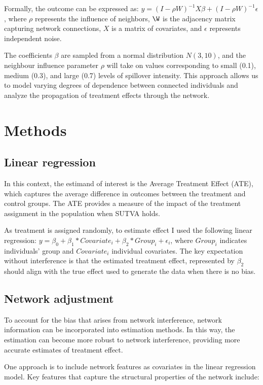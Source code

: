 \documentclass[a4paper,11pt]{article}
\begin{document}
Formally, the outcome can be expressed as: $y = (I - \rho W)^{-1} X\beta + (I - \rho W)^{-1} \epsilon$, where $\rho$ represents the influence of neighbors, $\W$ is the adjacency matrix capturing network connections, $X$ is a matrix of covariates, and $\epsilon$ represents independent noise. 

The coefficients $\beta$ are sampled from a normal distribution $N(3, 10)$, and the neighbour influence parameter $\rho$ will take on values corresponding to small (0.1), medium (0.3), and large (0.7) levels of spillover intensity. This approach allows us to model varying degrees of dependence between connected individuals and analyze the propagation of treatment effects through the network.

\section{Methods}
\subsection{Linear regression}
In this context, the estimand of interest is the Average Treatment Effect (ATE), which captures the average difference in outcomes between the treatment and control groups. The ATE provides a measure of the impact of the treatment assignment in the population when SUTVA holds.

As treatment is assigned randomly, to estimate effect I used the following linear regression: $y = \beta_0 + \beta_1*Covariate_{i} + \beta_2*Group_{i} + \epsilon_{i}$, where $Group_i$ indicates individuals' group and $Covariate_{i}$ individual covariates. The key expectation without interference is that the estimated treatment effect, represented by $\beta_2$ should align with the true effect used to generate the data when there is no bias. 

\subsection{Network adjustment}
To account for the bias that arises from network interference, network information can be incorporated into estimation methods. In this way, the estimation can become more robust to network interference, providing more accurate estimates of treatment effect.

One approach is to include network features as covariates in the linear regression model. Key features that capture the structural properties of the network include:
\end{document}
